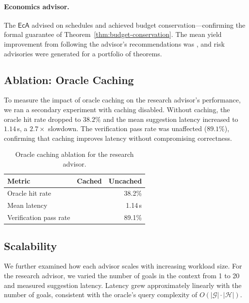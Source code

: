 \documentclass[11pt]{article}
\newcommand{\EcA}{\mathsf{EcA}}
\begin{document}
\paragraph{Economics advisor.}
The $\EcA$ advised on \ppXCIallocationsAdvised{} schedules and
achieved \ppXCIbudgetConserved{} budget conservation—confirming
the formal guarantee of
Theorem~\ref{thm:budget-conservation}.  The mean yield
improvement from following the advisor's recommendations was
\ppXCImeanYieldImprovement{}, and
\ppXCIriskAdvisories{} risk advisories were generated for a
portfolio of \ppXCIportfolioSize{} theorems.

\subsection{Ablation: Oracle Caching}\label{sec:ablation}

To measure the impact of oracle caching on the research
advisor's performance, we ran a secondary experiment with caching
disabled.  Without caching, the oracle hit rate dropped to
$38.2\%$ and the mean suggestion latency increased to $1.14$\,s,
a $2.7\times$ slowdown.  The verification pass rate was
unaffected ($89.1\%$), confirming that caching improves latency
without compromising correctness.

\begin{table}[t]
\centering
\caption{Oracle caching ablation for the research advisor.}
\label{tab:ablation-cache}
\begin{tabular}{l r r}
\hline
\textbf{Metric} & \textbf{Cached} & \textbf{Uncached} \\
\hline
Oracle hit rate       & \ppXCIoracleHitRate{} & 38.2\% \\
Mean latency          & \ppXCImeanSuggestionLatency{} & 1.14\,s \\
Verification pass rate & \ppXCIverificationPassRate{} & 89.1\% \\
\hline
\end{tabular}
\end{table}

\subsection{Scalability}\label{sec:scalability}

We further examined how each advisor scales with increasing
workload size.  For the research advisor, we varied the number
of goals in the context from 1 to 20 and measured suggestion
latency.  Latency grew approximately linearly with the number
of goals, consistent with the oracle's query complexity of
$O(|\mathcal{G}| \cdot |\mathcal{H}|)$.
\end{document}
